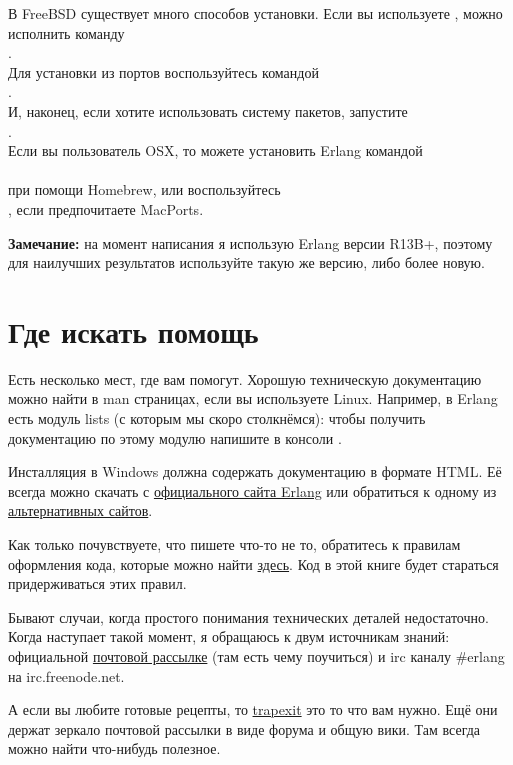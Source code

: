 В FreeBSD существует много способов установки.
Если вы используете , можно исполнить команду\\ 
.\\ 
Для установки из портов воспользуйтесь командой\\ 
.\\ 
И, наконец, если хотите использовать систему пакетов, запустите\\  
.\\ 
Если вы пользователь OSX, то можете установить Erlang командой\\ 
\\ 
при помощи Homebrew, или воспользуйтесь\\ 
, если предпочитаете MacPorts.\\ 
\colorbox{lgray}
{
\begin{minipage}{1.0\linewidth}
\textbf{Замечание:} на момент написания я использую Erlang версии R13B+, поэтому для наилучших результатов используйте такую же версию, либо более новую.
\end{minipage}
}
\section{Где искать помощь}
Есть несколько мест, где вам помогут.
Хорошую техническую документацию можно найти в man страницах, если вы используете Linux.
Например, в Erlang есть модуль lists (с которым мы скоро столкнёмся): чтобы получить документацию по этому модулю напишите в консоли .

Инсталляция в Windows должна содержать документацию в формате HTML.
Её всегда можно скачать с \href{http://erlang.org/doc/}{официального сайта Erlang} или обратиться к одному из \href{http://erldocs.com}{альтернативных сайтов}.

Как только почувствуете, что пишете что\--то не то, обратитесь к правилам оформления кода, которые можно найти \href{http://www.erlang.se/doc/programming_rules.shtml}{здесь}.
Код в этой книге будет стараться придерживаться этих правил.

Бывают случаи, когда простого понимания технических деталей недостаточно.
Когда наступает такой момент, я обращаюсь к двум источникам знаний: официальной \href{http://www.erlang.org/static/doc/mailinglist.html}{почтовой рассылке} (там есть чему поучиться) и irc каналу \#erlang на irc.freenode.net.

А если вы любите готовые рецепты, то \href{http://trapexit.org}{trapexit} это то что вам нужно.
Ещё они держат зеркало почтовой рассылки в виде форума и общую вики.
Там всегда можно найти что\--нибудь полезное.
